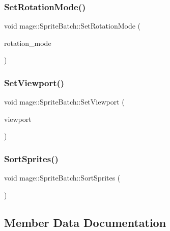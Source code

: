 \subsubsection{\texorpdfstring{Set\+Rotation\+Mode()}{SetRotationMode()}}
{\footnotesize\ttfamily void mage\+::\+Sprite\+Batch\+::\+Set\+Rotation\+Mode (\begin{DoxyParamCaption}\item[{D\+X\+G\+I\+\_\+\+M\+O\+D\+E\+\_\+\+R\+O\+T\+A\+T\+I\+ON}]{rotation\+\_\+mode }\end{DoxyParamCaption})}

\hypertarget{classmage_1_1_sprite_batch_aab9eab10e3ea1c62b483a67a47d9ccdc}{}\label{classmage_1_1_sprite_batch_aab9eab10e3ea1c62b483a67a47d9ccdc} 
\subsubsection{\texorpdfstring{Set\+Viewport()}{SetViewport()}}
{\footnotesize\ttfamily void mage\+::\+Sprite\+Batch\+::\+Set\+Viewport (\begin{DoxyParamCaption}\item[{const D3\+D11\+\_\+\+V\+I\+E\+W\+P\+O\+RT \&}]{viewport }\end{DoxyParamCaption})}

\hypertarget{classmage_1_1_sprite_batch_af7a5d406b02cd477c9b80eae9984aa86}{}\label{classmage_1_1_sprite_batch_af7a5d406b02cd477c9b80eae9984aa86} 
\subsubsection{\texorpdfstring{Sort\+Sprites()}{SortSprites()}}
{\footnotesize\ttfamily void mage\+::\+Sprite\+Batch\+::\+Sort\+Sprites (\begin{DoxyParamCaption}{ }\end{DoxyParamCaption})\hspace{0.3cm}{\ttfamily [private]}}



\subsection{Member Data Documentation}
\hypertarget{classmage_1_1_sprite_batch_a4d299bc556a82050b2e185d3c421247c}{}\label{classmage_1_1_sprite_batch_a4d299bc556a82050b2e185d3c421247c} 
